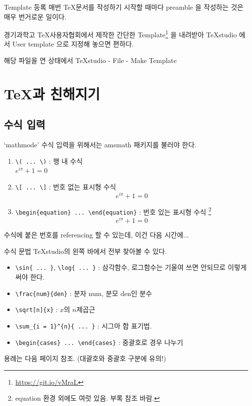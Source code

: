 \documentclass[12pt]{beamer}
\begin{document}
\begin{frame}{Template 등록}
	매번 \TeX 문서를 작성하기 시작할 때마다 preamble 을 작성하는 것은 매우 번거로운 일이다. 
	
	경기과학고 \TeX 사용자협회에서 제작한 간단한 Template\footnote{\url{https://git.io/vMraL}} 을 내려받아 TeXstudio 에서 User template 으로 지정해 놓으면 편하다.
	\vspace{0.7cm}
	
	해당 파일을 연 상태에서 TeXstudio - File - Make Template
\end{frame}
\section{\TeX 과 친해지기}
\subsection{수식 입력}
\begin{frame}[fragile]{`mathmode'}
	수식 입력을 위해서는 amsmath 패키지를 불러야 한다.
	\begin{enumerate}
		\item \verb|\( ... \)| : 행 내 수식 \\
		\( e^{i\pi}+1=0 \)
		\item \verb|\[ ... \]| : 번호 없는 표시형 수식
		\[ e^{i\pi}+1=0 \]
		\item \verb|\begin{equation} ... \end{equation}|
		: 번호 있는 표시형 수식
		\footnote{equation 환경 외에도 여럿 있음. 부록 참조 바람.}
		\begin{equation}
			e^{i\pi}+1=0
		\end{equation}
	\end{enumerate}
	수식에 붙은 번호를 referencing 할 수 있는데, 이건 다음 시간에...
\end{frame}
\begin{frame}[fragile]{수식 문법}
	TeXstudio의 왼쪽 바에서 전부 찾아볼 수 있다.
	\begin{itemize}
		\item \verb|\sin{ ... }|, \verb|\log{ ... }|
		: 삼각함수, 로그함수는 기울여 쓰면 안되므로 이렇게 써야 한다.
		\item \verb|\frac{num}{den}|
		: 분자 num, 분모 den인 분수
		\item \verb|\sqrt[n]{x}|
		: $x$의 $n$제곱근
		\item \verb|\sum_{i = 1}^{n}{ ... }|
		: 시그마 합 표기법.
		\item \verb|\begin{cases} ... \end{cases}|
		: 중괄호로 경우 나누기
	\end{itemize}
	용례는 다음 페이지 참조. {\footnotesize (대괄호와 중괄호 구분에 유의!)}
\end{frame}
\end{document}
